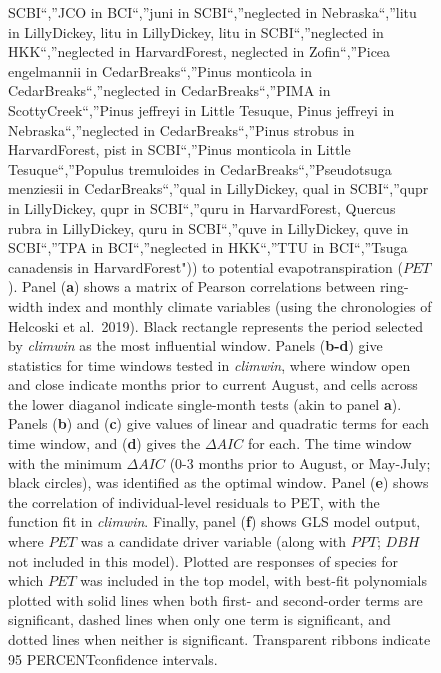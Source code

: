 \documentclass[
]{article}
\begin{document}
\begin{figure}
{SCBI``,''JCO in BCI``,''juni in SCBI``,''neglected in Nebraska``,''litu
in LillyDickey, litu in LillyDickey, litu in SCBI``,''neglected in
HKK``,''neglected in HarvardForest, neglected in Zofin``,''Picea
engelmannii in CedarBreaks``,''Pinus monticola in
CedarBreaks``,''neglected in CedarBreaks``,''PIMA in
ScottyCreek``,''Pinus jeffreyi in Little Tesuque, Pinus jeffreyi in
Nebraska``,''neglected in CedarBreaks``,''Pinus strobus in
HarvardForest, pist in SCBI``,''Pinus monticola in Little
Tesuque``,''Populus tremuloides in CedarBreaks``,''Pseudotsuga menziesii
in CedarBreaks``,''qual in LillyDickey, qual in SCBI``,''qupr in
LillyDickey, qupr in SCBI``,''quru in HarvardForest, Quercus rubra in
LillyDickey, quru in SCBI``,''quve in LillyDickey, quve in SCBI``,''TPA
in BCI``,''neglected in HKK``,''TTU in BCI``,''Tsuga canadensis in
HarvardForest")) to potential evapotranspiration (\(PET\)). Panel
(\textbf{a}) shows a matrix of Pearson correlations between ring-width
index and monthly climate variables (using the chronologies of Helcoski
et al.~2019). Black rectangle represents the period selected by
\emph{climwin} as the most influential window. Panels (\textbf{b-d})
give statistics for time windows tested in \emph{climwin}, where window
open and close indicate months prior to current August, and cells across
the lower diaganol indicate single-month tests (akin to panel
\textbf{a}). Panels (\textbf{b}) and (\textbf{c}) give values of linear
and quadratic terms for each time window, and (\textbf{d}) gives the
\(\Delta AIC\) for each. The time window with the minimum \(\Delta AIC\)
(0-3 months prior to August, or May-July; black circles), was identified
as the optimal window. Panel (\textbf{e}) shows the correlation of
individual-level residuals to PET, with the function fit in
\emph{climwin}. Finally, panel (\textbf{f}) shows GLS model output,
where \(PET\) was a candidate driver variable (along with \(PPT\);
\(DBH\) not included in this model). Plotted are responses of species
for which \(PET\) was included in the top model, with best-fit
polynomials plotted with solid lines when both first- and second-order
terms are significant, dashed lines when only one term is significant,
and dotted lines when neither is significant. Transparent ribbons
indicate 95 PERCENTconfidence intervals.}
\end{figure}
\end{document}
